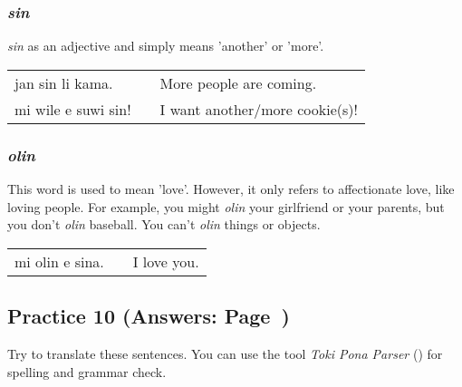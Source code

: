 \subsubsection*{\textit{sin}}
%
\textit{sin} as an adjective and simply means 'another' or 'more'. 

\begin{supertabular}{p{5,5cm}|ll}
jan sin li kama. && More people are coming. \\
mi wile e suwi sin! && I want another/more cookie(s)! \\
\end{supertabular} 
%
\subsubsection*{\textit{olin}}
%
This word is used to mean 'love'. 
However, it only refers to affectionate love, like loving people. 
For example, you might \textit{olin} your girlfriend or your parents, but you don't \textit{olin} baseball. 
You can't \textit{olin} things or objects. 

\begin{supertabular}{p{5,5cm}|ll}
mi olin e sina. && I love you. \\
\end{supertabular}  
%
\subsection*{Practice 10 (Answers: Page~\pageref{'questions_using_seme'})}
%
Try to translate these sentences. 
You can use the tool \textit{Toki Pona Parser} (\cite{www:rowa:02}) for spelling and grammar check. 


